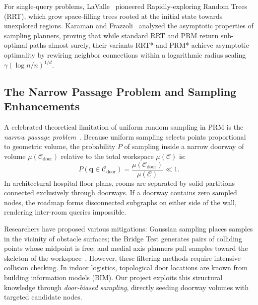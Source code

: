\documentclass[12pt,a4paper]{article}
\begin{document}
For single-query problems, LaValle~\cite{lavalle2006} pioneered Rapidly-exploring Random Trees (RRT), which grow space-filling trees rooted at the initial state towards unexplored regions. Karaman and Frazzoli~\cite{karaman2011} analyzed the asymptotic properties of sampling planners, proving that while standard RRT and PRM return sub-optimal paths almost surely, their variants RRT* and PRM* achieve asymptotic optimality by rewiring neighbor connections within a logarithmic radius scaling $\gamma (\log n / n)^{1/d}$.

\subsection{The Narrow Passage Problem and Sampling Enhancements}
A celebrated theoretical limitation of uniform random sampling in PRM is the \textit{narrow passage problem}~\cite{hsu2006}. Because uniform sampling selects points proportional to geometric volume, the probability $P$ of sampling inside a narrow doorway of volume $\mu(\mathcal{C}_{\text{door}})$ relative to the total workspace $\mu(\mathcal{C})$ is:
\begin{equation}
P(\mathbf{q} \in \mathcal{C}_{\text{door}}) = \frac{\mu(\mathcal{C}_{\text{door}})}{\mu(\mathcal{C})} \ll 1.
\end{equation}
In architectural hospital floor plans, rooms are separated by solid partitions connected exclusively through doorways. If a doorway contains zero sampled nodes, the roadmap forms disconnected subgraphs on either side of the wall, rendering inter-room queries impossible.

Researchers have proposed various mitigations: Gaussian sampling places samples in the vicinity of obstacle surfaces; the Bridge Test generates pairs of colliding points whose midpoint is free; and medial axis planners pull samples toward the skeleton of the workspace~\cite{hsu2006}. However, these filtering methods require intensive collision checking. In indoor logistics, topological door locations are known from building information models (BIM). Our project exploits this structural knowledge through \textit{door-biased sampling}, directly seeding doorway volumes with targeted candidate nodes.
\end{document}
